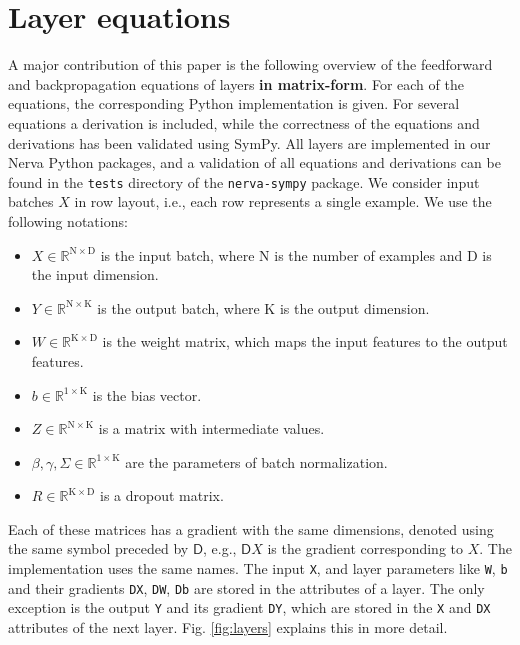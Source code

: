 \documentclass[twoside,11pt]{article}
\newcommand{\const}[1]{\ensuremath{\mathrm{#1}}} %
\newcommand{\Gradient}{\textsf{D}}
\newcommand{\Reals}{\mathbb{R}}
\begin{document}
\section{Layer equations} \label{appendix:layers}
A major contribution of this paper is the following overview of the feedforward and backpropagation equations of layers \textbf{in matrix-form}. For each of the equations, the corresponding Python implementation is given. For several equations a derivation is included, while the correctness of the equations and derivations has been validated using SymPy. All layers are implemented in our Nerva Python packages, and a validation of all equations and derivations can be found in the \texttt{tests} directory of the \texttt{nerva-sympy} package. We consider input batches $X$ in row layout, i.e., each row represents a single example. We use the following notations:
\begin{itemize}
    \item $X \in \Reals^{\const{N} \times \const{D}}$ is the input batch, where $\const{N}$ is the number of examples and $\const{D}$ is the input dimension.
    \item $Y \in \Reals^{\const{N} \times \const{K}}$ is the output batch, where $\const{K}$ is the output dimension.
    \item $W \in \Reals^{\const{K} \times \const{D}}$ is the weight matrix, which maps the input features to the output features.
    \item $b \in \Reals^{1 \times \const{K}}$ is the bias vector.
    \item $Z \in \Reals^{\const{N} \times \const{K}}$ is a matrix with intermediate values.
    \item $\beta, \gamma, \Sigma \in \Reals^{1 \times \const{K}}$ are the parameters of batch normalization.
    \item $R \in \Reals^{\const{K} \times \const{D}}$ is a dropout matrix.
\end{itemize}
Each of these matrices has a gradient with the same dimensions, denoted using the same symbol preceded by $\Gradient{}$, e.g., $\Gradient{X}$ is the gradient corresponding to $X$. The implementation uses the same names. The input \texttt{X}, and layer parameters like \texttt{W}, \texttt{b} and their gradients \texttt{DX}, \texttt{DW}, \texttt{Db} are stored in the attributes of a layer. The only exception is the output \texttt{Y} and its gradient \texttt{DY}, which are stored in the \texttt{X} and \texttt{DX} attributes of the next layer. Fig. \ref{fig:layers} explains this in more detail.
\end{document}
